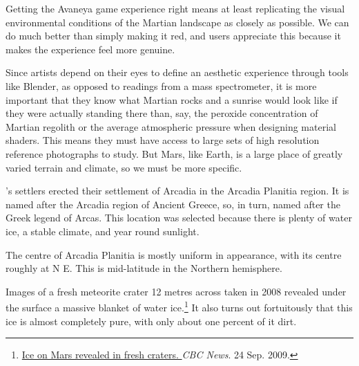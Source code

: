 


    {}
Getting the Avaneya game experience right means at least replicating the visual environmental conditions of the Martian landscape as closely as possible. We can do much better than simply making it red, and users appreciate this because it makes the experience feel more genuine.

Since artists depend on their eyes to define an aesthetic experience through tools like Blender, as opposed to readings from a mass spectrometer, it is more important that they know what Martian rocks and a sunrise would look like if they were actually standing there than, say, the peroxide concentration of Martian regolith or the average atmospheric pressure when designing material shaders. This means they must have access to large sets of high resolution reference photographs to study. But Mars, like Earth, is a large place of greatly varied terrain and climate, so we must be more specific.

's settlers erected their settlement of Arcadia in the Arcadia Planitia region. It is named after the Arcadia region of Ancient Greece, so, in turn, named after the Greek legend of Arcas. This location was selected because there is plenty of water ice, a stable climate, and year round sunlight.

The centre of Arcadia Planitia is mostly uniform in appearance, with its centre roughly at N E. This is mid-latitude in the Northern hemisphere. 

Images of a fresh meteorite crater 12 metres across taken in 2008 revealed under the surface a massive blanket of water ice.\footnote{\href{http://www.cbc.ca/news/technology/story/2009/09/24/tech-space-water-mars-crater.html}{Ice on Mars revealed in fresh craters. }{\it CBC News}. 24 Sep. 2009.} It also turns out fortuitously that this ice is almost completely pure, with only about one percent of it dirt.

